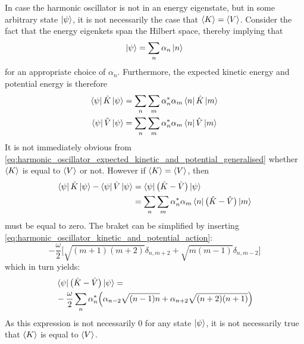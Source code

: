 \documentclass[nofootinbib,reprint,english]{revtex4-1}
\begin{document}
In case the harmonic oscillator is not in an energy eigenstate, but in some arbitrary state \(\ket{\psi}\), it is not necessarily the case that \(\expval{K}=\expval{V}\). Consider the fact that the energy eigenkets span the Hilbert space, thereby implying that
\begin{equation}
\ket{\psi}=\sum_n\alpha_n\ket{n}
\end{equation}
for an appropriate choice of \(\alpha_n\). Furthermore, the expected kinetic energy and potential energy is therefore
\begin{subequations}\label{eq:harmonic_oscillator_expected_kinetic_and_potential_generalised}
\begin{align}
\bra{\psi}\hat{K}\ket{\psi}&=\sum_n\sum_m\alpha_n^*\alpha_m\bra{n}\hat{K}\ket{m}\\
\bra{\psi}\hat{V}\ket{\psi}&=\sum_n\sum_m\alpha_n^*\alpha_m\bra{n}\hat{V}\ket{m}
\end{align}
\end{subequations}
It is not immediately obvious from \eqref{eq:harmonic_oscillator_expected_kinetic_and_potential_generalised} whether \(\expval{K}\) is equal to \(\expval{V}\) or not. However if \(\expval{K}=\expval{V}\), then
\begin{align*}
\bra{\psi}\hat{K}\ket{\psi}-\bra{\psi}\hat{V}\ket{\psi}&=\bra{\psi}\big(\hat{K}-\hat{V}\big)\ket{\psi}\\
&=\sum_n\sum_m\alpha_n^*\alpha_m\bra{n}\big(\hat{K}-\hat{V}\big)\ket{m}
\end{align*}
must be equal to zero. The braket can be simplified by inserting \eqref{eq:harmonic_oscillator_kinetic_and_potential_action}:
\[-\frac{\omega}{2}\bigg[\sqrt{(m+1)(m+2)}\delta_{n,m+2}+\sqrt{m(m-1)}\delta_{n,m-2}\bigg]\]
which in turn yields:
\begin{align*}
&\bra{\psi}\big(\hat{K}-\hat{V}\big)\ket{\psi}=\\
&-\frac{\omega}{2}\sum_n\alpha_n^*\Big(\alpha_{n-2}\sqrt{(n-1)n}+\alpha_{n+2}\sqrt{(n+2)(n+1)}\Big)
\end{align*}
As this expression is not necessarily 0 for any state \(\ket{\psi}\), it is not necessarily true that \(\expval{K}\) is equal to \(\expval{V}\).
\end{document}
